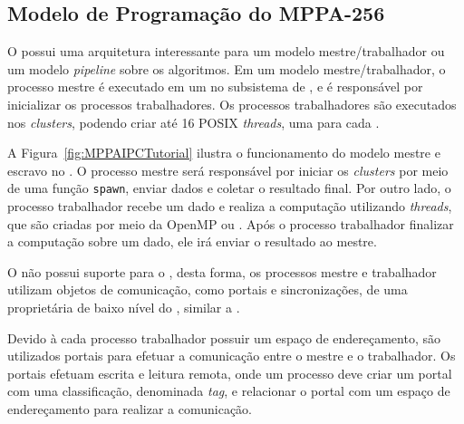 \subsection{Modelo de Programação do MPPA-256}

%
%
%

O \mppa possui uma arquitetura interessante para um modelo mestre/trabalhador ou
um modelo \textit{pipeline} sobre os algoritmos. Em um modelo
mestre/trabalhador, o processo mestre é executado em um \rman no subsistema de
\es, e é responsável por inicializar os processos trabalhadores. Os processos
trabalhadores são executados nos \textit{clusters}, podendo criar até 16 POSIX
\textit{threads}, uma para cada \pe.

A Figura~\ref{fig:MPPAIPCTutorial} ilustra o funcionamento do modelo mestre e
escravo no \mppa. O processo mestre será responsável por iniciar os
\textit{clusters} por meio de uma função \texttt{spawn}, enviar dados e coletar
o resultado final. Por outro lado, o processo trabalhador recebe um dado e
realiza a computação utilizando \textit{threads}, que são criadas por meio da
\api OpenMP ou \posix. Após o processo trabalhador finalizar a computação sobre
um dado, ele irá enviar o resultado ao mestre.

O \mppa não possui suporte para o \mpi, desta forma, os processos mestre e
trabalhador utilizam objetos de comunicação, como portais e sincronizações, de
uma \api proprietária de baixo nível do \mppa, similar a \posix \ipc.

Devido à cada processo trabalhador possuir um espaço de endereçamento, são
utilizados portais para efetuar a comunicação entre o mestre e o trabalhador. Os
portais efetuam escrita e leitura remota, onde um processo deve criar um portal
com uma classificação, denominada \textit{tag}, e relacionar o portal com um
espaço de endereçamento para realizar a comunicação.

